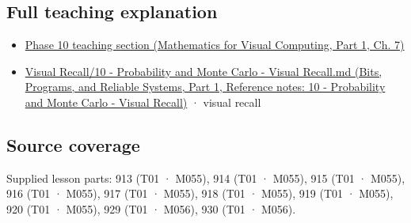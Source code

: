 \subsection{Full teaching explanation}\label{appendix-54c383df9992-full-teaching-explanation}

\hypertarget{appendix-54c383df9992-full-teaching-explanation}{}

\begin{itemize}
\tightlist
\item
  \href{../02-Mathematics-for-Visual-Computing-P01/main.pdf\#02-foundations-ii-ch023-expected-values-describe-centers-covariance-describes-dependence}{Phase 10 teaching section (Mathematics for Visual Computing, Part 1, Ch. 7)}
\item
  \href{../01-Bits-Programs-and-Reliable-Systems-P01/main.pdf\#appendix-cb5af353ef77}{Visual Recall/10 - Probability and Monte Carlo - Visual Recall.md (Bits, Programs, and Reliable Systems, Part 1, Reference notes: 10 - Probability and Monte Carlo - Visual Recall)} · visual recall
\end{itemize}

\subsection{Source coverage}\label{appendix-54c383df9992-source-coverage}

\hypertarget{appendix-54c383df9992-source-coverage}{}

Supplied lesson parts: 913 (T01 · M055), 914 (T01 · M055), 915 (T01 · M055), 916 (T01 · M055), 917 (T01 · M055), 918 (T01 · M055), 919 (T01 · M055), 920 (T01 · M055), 929 (T01 · M056), 930 (T01 · M056).
